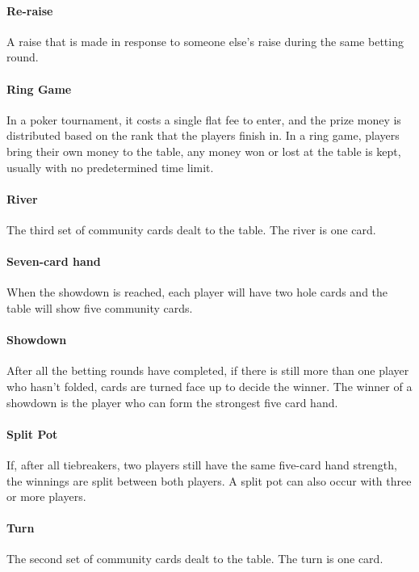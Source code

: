 \paragraph*{Re-raise} A raise that is made in response to someone else's raise during the same betting round.
 
\paragraph*{Ring Game} In a poker tournament, it costs a single flat fee to enter, and the prize money is distributed based on the rank that the players finish in. In a ring game, players bring their own money to the table, any money won or lost at the table is kept, usually with no predetermined time limit.
 
\paragraph*{River} The third set of community cards dealt to the table. The river is one card.

\paragraph*{Seven-card hand} When the showdown is reached, each player will have two hole cards and the table will show five community cards.

\paragraph*{Showdown} After all the betting rounds have completed, if there is still more than one player who hasn't folded, cards are turned face up to decide the winner. The winner of a showdown is the player who can form the strongest five card hand.

\paragraph*{Split Pot} If, after all tiebreakers, two players still have the same five-card hand strength, the winnings are split between both players. A split pot can also occur with three or more players.

\paragraph*{Turn} The second set of community cards dealt to the table. The turn is one card.





\clearpage



\begin{flushleft}



\end{flushleft}
\clearpage

